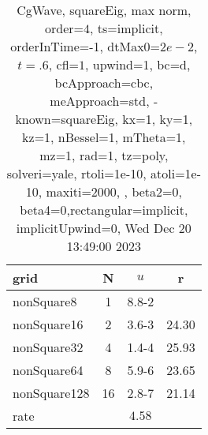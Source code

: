 \begin{table}[H]\tableFont %
\begin{center}
\begin{tabular}{|l|c|c|c|} \hline 
grid  & N &  $ u $ & r \\ \hline 
  nonSquare8 &     1 & \num{8.8}{-2} &        \\ \hline
 nonSquare16 &     2 & \num{3.6}{-3} & 24.30  \\ \hline
 nonSquare32 &     4 & \num{1.4}{-4} & 25.93  \\ \hline
 nonSquare64 &     8 & \num{5.9}{-6} & 23.65  \\ \hline
nonSquare128 &    16 & \num{2.8}{-7} & 21.14  \\ \hline
    rate             &       &  $4.58$       &       \\ \hline
\end{tabular}
\caption{CgWave, squareEig, max norm, order=$4$, ts=implicit, orderInTime=-1, dtMax0=$2e-2$, $t=.6$, cfl=$1$, upwind=1, bc=d, bcApproach=cbc, meApproach=std, -known=squareEig, kx=1, ky=1, kz=1, nBessel=1, mTheta=1, mz=1, rad=1, tz=poly, solveri=yale, rtoli=1e-10, atoli=1e-10, maxiti=2000, , beta2=0, beta4=0,rectangular=implicit, implicitUpwind=0, Wed Dec 20 13:49:00 2023}\label{table:squareEigOrder4max}
\end{center}
\end{table}
